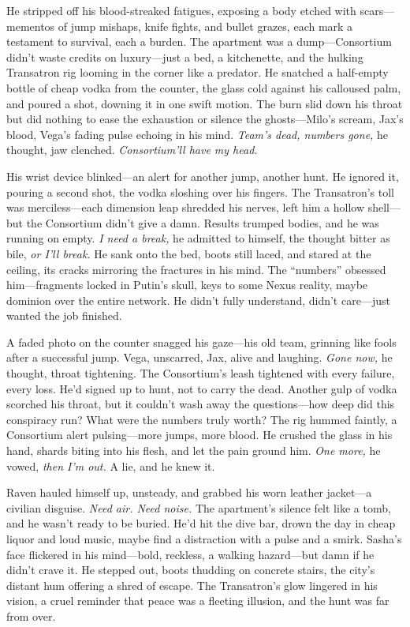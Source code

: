 \documentclass[12pt]{book}
\begin{document}
He stripped off his blood-streaked fatigues, exposing a body etched with scars---mementos of jump mishaps, knife fights, and bullet grazes, each mark a testament to survival, each a burden. The apartment was a dump---Consortium didn’t waste credits on luxury---just a bed, a kitchenette, and the hulking Transatron rig looming in the corner like a predator. He snatched a half-empty bottle of cheap vodka from the counter, the glass cold against his calloused palm, and poured a shot, downing it in one swift motion. The burn slid down his throat but did nothing to ease the exhaustion or silence the ghosts---Milo’s scream, Jax’s blood, Vega’s fading pulse echoing in his mind. \textit{Team’s dead, numbers gone,} he thought, jaw clenched. \textit{Consortium’ll have my head.}

His wrist device blinked---an alert for another jump, another hunt. He ignored it, pouring a second shot, the vodka sloshing over his fingers. The Transatron’s toll was merciless---each dimension leap shredded his nerves, left him a hollow shell---but the Consortium didn’t give a damn. Results trumped bodies, and he was running on empty. \textit{I need a break,} he admitted to himself, the thought bitter as bile, \textit{or I’ll break.} He sank onto the bed, boots still laced, and stared at the ceiling, its cracks mirroring the fractures in his mind. The ``numbers'' obsessed him---fragments locked in Putin’s skull, keys to some Nexus reality, maybe dominion over the entire network. He didn’t fully understand, didn’t care---just wanted the job finished.

A faded photo on the counter snagged his gaze---his old team, grinning like fools after a successful jump. Vega, unscarred, Jax, alive and laughing. \textit{Gone now,} he thought, throat tightening. The Consortium’s leash tightened with every failure, every loss. He’d signed up to hunt, not to carry the dead. Another gulp of vodka scorched his throat, but it couldn’t wash away the questions---how deep did this conspiracy run? What were the numbers truly worth? The rig hummed faintly, a Consortium alert pulsing---more jumps, more blood. He crushed the glass in his hand, shards biting into his flesh, and let the pain ground him. \textit{One more,} he vowed, \textit{then I’m out.} A lie, and he knew it.

Raven hauled himself up, unsteady, and grabbed his worn leather jacket---a civilian disguise. \textit{Need air. Need noise.} The apartment’s silence felt like a tomb, and he wasn’t ready to be buried. He’d hit the dive bar, drown the day in cheap liquor and loud music, maybe find a distraction with a pulse and a smirk. Sasha’s face flickered in his mind---bold, reckless, a walking hazard---but damn if he didn’t crave it. He stepped out, boots thudding on concrete stairs, the city’s distant hum offering a shred of escape. The Transatron’s glow lingered in his vision, a cruel reminder that peace was a fleeting illusion, and the hunt was far from over.
\end{document}
